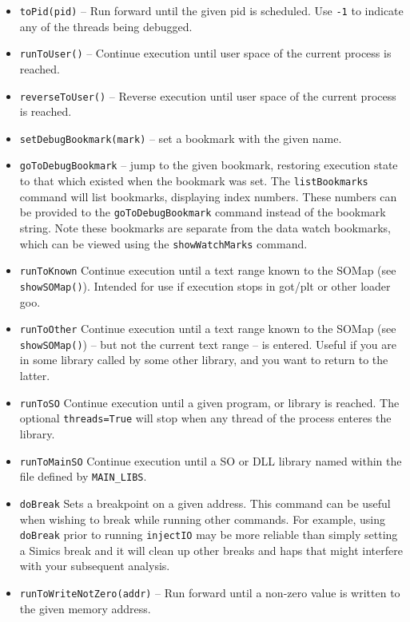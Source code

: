 \documentclass[titlepage]{article}
\begin{document}
\begin{itemize}
\item {\tt toPid(pid)} -- Run forward until the given pid is scheduled.  Use {\tt -1} to indicate any of the threads being debugged.

\item {\tt runToUser()} – Continue execution until user space of the current process is reached.

\item {\tt reverseToUser()} – Reverse execution until user space of the current process is reached.

\item {\tt setDebugBookmark(mark)} – set a bookmark with the given name.

\item {\tt goToDebugBookmark} – jump to the given bookmark, restoring execution state to that which existed when the bookmark was set.  The
{\tt listBookmarks} command will list bookmarks, displaying  index numbers.  These numbers can be provided to the {\tt goToDebugBookmark} command instead
of the bookmark string.  Note these bookmarks are separate from the data watch bookmarks, which can be viewed using the {\tt showWatchMarks} command.

\item {\tt runToKnown} Continue execution until a text range known to the SOMap (see {\tt showSOMap()}).  Intended for use if execution stops in got/plt 
or other loader goo.

\item {\tt runToOther} Continue execution until a text range known to the SOMap (see {\tt showSOMap()}) -- but not the current text range -- is entered.
Useful if you are in some library called by some other library, and you want to return to the latter.

\item {\tt runToSO} Continue execution until a given program, or library is reached.  The optional {\tt threads=True} will stop when any thread of the
process enteres the library.
\item {\tt runToMainSO} Continue execution until a SO or DLL library named within the file defined by {\tt MAIN\_LIBS}.

\item {\tt doBreak} Sets a breakpoint on a given address.  This command can be useful when wishing to break while running other commands.  For example,
using {\tt doBreak} prior to running {\tt injectIO} may be more reliable than simply setting a Simics break and it will clean up other breaks and haps that 
might interfere with your subsequent analysis.

\item {\tt runToWriteNotZero(addr)} – Run forward until a non-zero value is written to the given memory address.


\end{itemize}
\end{document}
